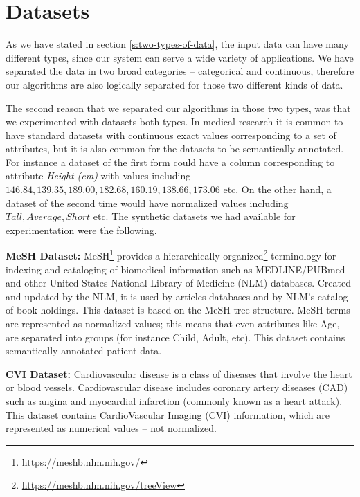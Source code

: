 \section{Datasets}\label{s:datasets}
As we have stated in section \ref{s:two-types-of-data}, the input data can have many different types, since our system can serve a wide variety of applications.
We have separated the data in two broad categories -- categorical and continuous, therefore our algorithms are also logically separated for those two different kinds of data.

The second reason that we separated our algorithms in those two types, was that we experimented with datasets both types.
In medical research it is common to have standard datasets with continuous exact values corresponding to a set of attributes, but it is also common for the datasets to be semantically annotated.
For instance a dataset of the first form could have a column corresponding to attribute \textit{Height (cm)} with values including $146.84, 139.35, 189.00, 182.68, 160.19, 138.66, 173.06$ etc.
On the other hand, a dataset of the second time would have normalized values including $Tall, Average, Short$ etc.
The synthetic datasets we had available for experimentation were the following.

\textbf{MeSH Dataset:}
MeSH\footnote{\href{https://meshb.nlm.nih.gov/}{https://meshb.nlm.nih.gov/}} provides a hierarchically-organized\footnote{\href{https://meshb.nlm.nih.gov/treeView}{https://meshb.nlm.nih.gov/treeView}} terminology for indexing and cataloging of biomedical information such as MEDLINE/PUBmed and other United States National Library of Medicine (NLM) databases.
Created and updated by the NLM, it is used by articles databases and by NLM's catalog of book holdings.
This dataset is based on the MeSH tree structure.
MeSH terms are represented as normalized values; this means that even attributes like Age, are separated into groups (for instance Child, Adult, etc).
This dataset contains semantically annotated patient data.

\textbf{CVI Dataset:}
Cardiovascular disease is a class of diseases that involve the heart or blood vessels.
Cardiovascular disease includes coronary artery diseases (CAD) such as angina and myocardial infarction (commonly known as a heart attack).
This dataset contains CardioVascular Imaging (CVI) information, which are represented as numerical values – not normalized.



